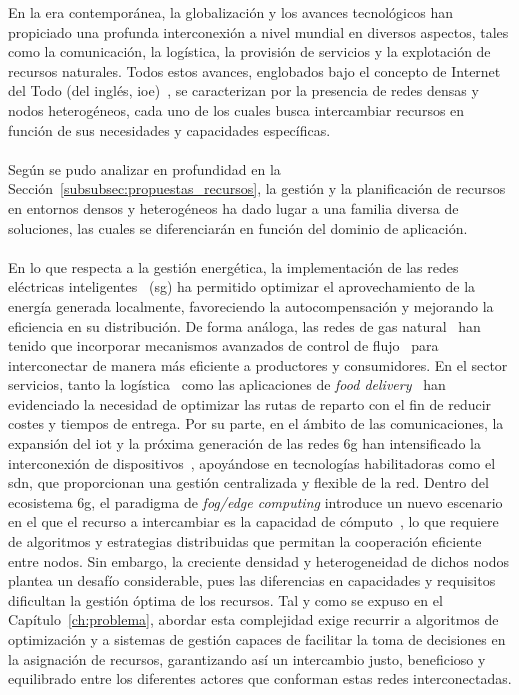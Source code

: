 En la era contemporánea, la globalización y los avances tecnológicos han propiciado una profunda interconexión a nivel mundial en diversos aspectos, tales como la comunicación, la logística, la provisión de servicios y la explotación de recursos naturales. Todos estos avances, englobados bajo el concepto de Internet del Todo (del inglés, \gls{ioe})~\cite{Akan23}, se caracterizan por la presencia de redes densas y nodos heterogéneos, cada uno de los cuales busca intercambiar recursos en función de sus necesidades y capacidades específicas.\\
\\
Según se pudo analizar en profundidad en la Sección~\ref{subsubsec:propuestas_recursos}, la gestión y la planificación de recursos en entornos densos y heterogéneos ha dado lugar a una familia diversa de soluciones, las cuales se diferenciarán en función del dominio de aplicación.\\
\\
En lo que respecta a la gestión energética, la implementación de las redes eléctricas inteligentes~\cite{Rodriguez16,Tenti23} (\gls{sg}) ha permitido optimizar el aprovechamiento de la energía generada localmente, favoreciendo la autocompensación y mejorando la eficiencia en su distribución. De forma análoga, las redes de gas natural~\cite{Midthun13} han tenido que incorporar mecanismos avanzados de control de flujo~\cite{Zlotnik15} para interconectar de manera más eficiente a productores y consumidores. En el sector servicios, tanto la logística~\cite{moreno2024multi,Chen21taxi} como las aplicaciones de \textit{food delivery}~\cite{Nguyen23,Liu19food} han evidenciado la necesidad de optimizar las rutas de reparto con el fin de reducir costes y tiempos de entrega. Por su parte, en el ámbito de las comunicaciones, la expansión del \gls{iot} y la próxima generación de las redes \gls{6g} han intensificado la interconexión de dispositivos~\cite{jiang2021road}, apoyándose en tecnologías habilitadoras como el \gls{sdn}, que proporcionan una gestión centralizada y flexible de la red. Dentro del ecosistema \gls{6g}, el paradigma de \textit{fog/edge computing} introduce un nuevo escenario en el que el recurso a intercambiar es la capacidad de cómputo~\cite{Bachiega23}, lo que requiere de algoritmos y estrategias distribuidas que permitan la cooperación eficiente entre nodos. Sin embargo, la creciente densidad y heterogeneidad de dichos nodos plantea un desafío considerable, pues las diferencias en capacidades y requisitos dificultan la gestión óptima de los recursos. Tal y como se expuso en el Capítulo~\ref{ch:problema}, abordar esta complejidad exige recurrir a algoritmos de optimización y a sistemas de gestión capaces de facilitar la toma de decisiones en la asignación de recursos, garantizando así un intercambio justo, beneficioso y equilibrado entre los diferentes actores que conforman estas redes interconectadas.\\
